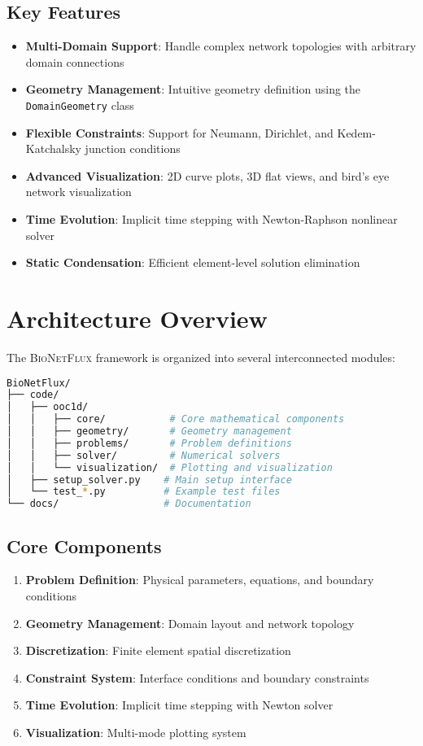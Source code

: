 \documentclass[11pt,a4paper]{article}
\newcommand{\code}[1]{\texttt{#1}}
\newcommand{\bionetflux}{\textsc{BioNetFlux}}
\begin{document}
\subsection{Key Features}

\begin{itemize}
    \item \textbf{Multi-Domain Support}: Handle complex network topologies with arbitrary domain connections
    \item \textbf{Geometry Management}: Intuitive geometry definition using the \code{DomainGeometry} class
    \item \textbf{Flexible Constraints}: Support for Neumann, Dirichlet, and Kedem-Katchalsky junction conditions
    \item \textbf{Advanced Visualization}: 2D curve plots, 3D flat views, and bird's eye network visualization
    \item \textbf{Time Evolution}: Implicit time stepping with Newton-Raphson nonlinear solver
    \item \textbf{Static Condensation}: Efficient element-level solution elimination
\end{itemize}

\section{Architecture Overview}

The \bionetflux{} framework is organized into several interconnected modules:

\begin{lstlisting}[language=bash, caption={BioNetFlux Directory Structure}]
BioNetFlux/
├── code/
│   ├── ooc1d/
│   │   ├── core/           # Core mathematical components
│   │   ├── geometry/       # Geometry management
│   │   ├── problems/       # Problem definitions
│   │   ├── solver/         # Numerical solvers
│   │   └── visualization/  # Plotting and visualization
│   ├── setup_solver.py    # Main setup interface
│   └── test_*.py          # Example test files
└── docs/                  # Documentation
\end{lstlisting}

\subsection{Core Components}

\begin{enumerate}
    \item \textbf{Problem Definition}: Physical parameters, equations, and boundary conditions
    \item \textbf{Geometry Management}: Domain layout and network topology
    \item \textbf{Discretization}: Finite element spatial discretization
    \item \textbf{Constraint System}: Interface conditions and boundary constraints
    \item \textbf{Time Evolution}: Implicit time stepping with Newton solver
    \item \textbf{Visualization}: Multi-mode plotting system
\end{enumerate}
\end{document}
